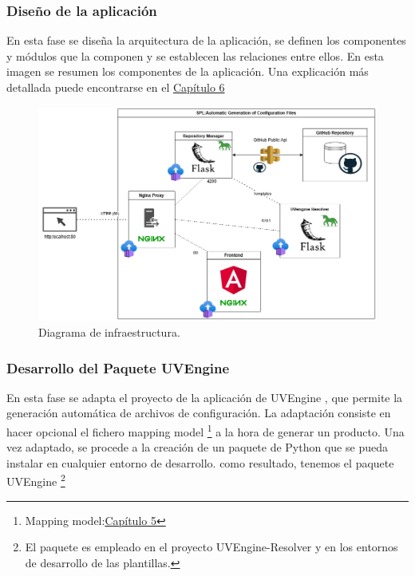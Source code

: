 \documentclass[12pt, a4paper, twoside]{article}
\begin{document}
\newpage 
\subsubsection{Diseño de la aplicación}
En esta fase se diseña la arquitectura de la aplicación, se definen los componentes y módulos que la componen y se establecen las relaciones entre ellos. 
En esta imagen se resumen los componentes de la aplicación. Una explicación más detallada puede encontrarse en el \hyperref[sec:Arquitectura y Descripción del sistema]{Capítulo 6}
\begin{figure}[h]
	\centering
		\includegraphics[width=1\textwidth]{Arquitectura Contenedores.png}
	\caption{Diagrama de infraestructura.} 
\end{figure}
\subsubsection{Desarrollo del Paquete UVEngine}
En esta fase se adapta el proyecto de la aplicación de UVEngine \cite{uvengine_github}, que permite la generación automática de archivos de configuración.
La adaptación consiste en hacer opcional el fichero mapping model \footnote{Mapping model:\hyperref[sec:Mapping Model]{Capítulo 5}} a la hora de generar un producto. Una vez adaptado, se procede a la creación de un paquete de Python que se pueda instalar en cualquier entorno de desarrollo.
como resultado, tenemos el paquete UVEngine \cite{uvengine_pypi}\footnote{El paquete es empleado en el proyecto UVEngine-Resolver y en los entornos de desarrollo de las plantillas.}
\end{document}
